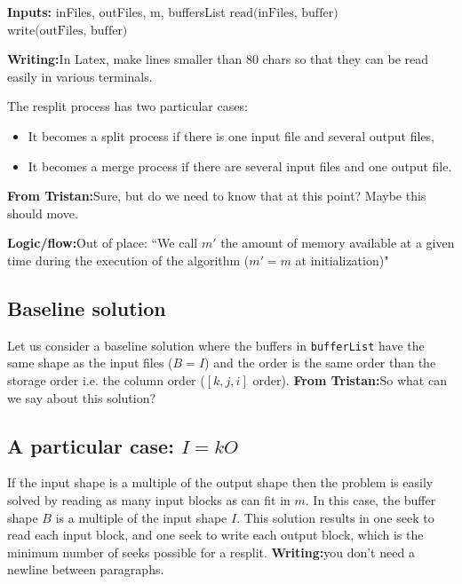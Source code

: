 \documentclass[conference]{IEEEtran}
\newcommand{\logic}[1]{\color{red}\textbf{Logic/flow:}#1\color{black}}
\newcommand{\writing}[1]{\color{green}\textbf{Writing:}#1\color{black}}
\newcommand{\tristan}[1]{\color{orange}\textbf{From Tristan:}#1\color{black}}
\begin{document}
\begin{algorithm}[H]
  \caption{General resplit algorithm \tristan{m is unused, the algorithm
  should be fixed to use it.}}
  \label{algo:generalresplit}
  \begin{algorithmic}
    \STATE \textbf{Inputs:} {inFiles, outFiles, m, buffersList}
      \STATE $\textrm{read(inFiles, buffer)}$
      \STATE $\textrm{write(outFiles, buffer)}$
    \ENDFOR

  \end{algorithmic}
\end{algorithm}

\writing{In Latex, make lines smaller than 80 chars so that they can
be read easily in various terminals.}

The resplit process has two particular cases:
\begin{itemize}
  \item It becomes a split process if there is one input file and several output files,
  \item It becomes a merge process if there are several input files and one output file.
\end{itemize}
\tristan{Sure, but do we need to know that at this point? Maybe this should move.}

\logic{Out of place:
``We call $m'$ the amount of memory available at a given time
during the execution of the algorithm ($m'=m$ at initialization)"
}

\subsection{Baseline solution}

Let us consider a baseline solution where the buffers in
\texttt{bufferList} have the same shape as the input files ($B=I$) and the
order is the same order than the storage order i.e. the column order ($[k,
j, i]$ order).
\tristan{So what can we say about this solution? }

\subsection{A particular case: $I=kO$}

If the input shape is a multiple of the output shape then the problem
is easily solved by reading as many input blocks as can fit in $m$. In this case, the buffer
shape $B$ is a multiple of the input shape $I$. This solution results in
one seek to read each input block, and one seek to write each output block, which is
the minimum number of seeks possible for a resplit. \writing{you don't need a newline between paragraphs.}
\end{document}
